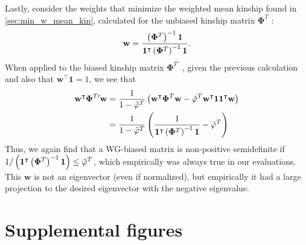\documentclass[11pt]{article}
\newcommand{\kinMat}[1][T]{%
  \ensuremath{%
    \mathbf{\Phi}^{#1}
  }%
  \xspace%
}%
\newcommand{\kinMatPrime}{%
  \ensuremath{%
    \mathbf{\Phi}^{T\prime}
  }%
  \xspace%
}%
\newcommand{\beginsupplement}{%
  \setcounter{table}{0}
  \renewcommand{\thetable}{S\arabic{table}}%
  \setcounter{figure}{0}
  \renewcommand{\thefigure}{S\arabic{figure}}%
  \setcounter{section}{0}
  \renewcommand{\thesection}{S\arabic{section}}%
  \setcounter{equation}{0}
  \renewcommand{\theequation}{S\arabic{equation}}%
  \setcounter{page}{1}
  \renewcommand{\thepage}{S\arabic{page}}%
}
\begin{document}
\begin{appendices}
  Lastly, consider the weights that minimize the weighted mean kinship found in \cref{sec:min_w_mean_kin}, calculated for the unbiased kinship matrix \kinMat:
  $$
  \mathbf{w}
  = 
  \frac{ \left( \kinMat \right)^{-1} \mathbf{1} }{ \mathbf{1}^\intercal \left( \kinMat \right)^{-1} \mathbf{1} }
  .
  $$
  When applied to the biased kinship matrix \kinMatPrime, given the previous calculation and also that $\mathbf{w}^\intercal \mathbf{1} = 1$, we see that
  \begin{align*}
    \mathbf{w}^\intercal \kinMatPrime \mathbf{w}
    &=
      \frac{1}{1-\tilde{\varphi}^T}
      \left(
      \mathbf{w}^\intercal \kinMat \mathbf{w}
      - \tilde{\varphi}^T \mathbf{w}^\intercal \mathbf{1}\mathbf{1}^\intercal \mathbf{w}
      \right)
      \\
    &=
      \frac{1}{1-\tilde{\varphi}^T}
      \left(
      \frac{ 1 }{ \mathbf{1}^\intercal \left( \kinMat \right)^{-1} \mathbf{1} }
      - \tilde{\varphi}^T
      \right)
  \end{align*}
  Thus, we again find that a WG-biased matrix is non-positive semidefinite if $1 / \left( \mathbf{1}^\intercal \left( \kinMat \right)^{-1} \mathbf{1} \right) \le \tilde{\varphi}^T$, which empirically was always true in our evaluations.
  This $\mathbf{w}$ is not an eigenvector (even if normalized), but empirically it had a large projection to the desired eigenvector with the negative eigenvalue.
  
\end{appendices}




\clearpage

\beginsupplement

\section*{Supplemental figures}
\end{document}

